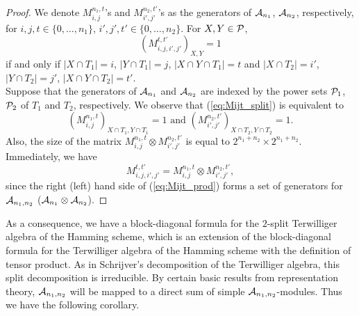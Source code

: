 \documentclass[final,onecolumn]{IEEEtran}
\theoremstyle{definition}
\begin{document}
\begin{proof}
	We denote $M_{i, j}^{n_{1}, t}$'s and $M_{i', j'}^{n_{2}, t'}$'s as the generators of ${\cal A}_{n_{1}}$, ${\cal A}_{n_{2}}$, respectively, for $i, j, t \in \{0, \dots, n_{1}\}$, $i', j', t' \in \{0, \dots, n_{2}\}$. For $X, Y \in {\cal P}$,
	\begin{equation}
		(M_{i, j, i', j'}^{t, t'})_{X, Y} = 1  \label{eq:Mijt_split}
	\end{equation}
	if and only if $\lvert X \cap T_{1}\rvert = i$, $\lvert Y \cap T_{1}\rvert = j$, $\lvert X \cap Y \cap T_{1}\rvert = t$ and $\lvert X \cap T_{2}\rvert = i'$, $\lvert Y \cap T_{2}\rvert = j'$, $\lvert X \cap Y \cap T_{2}\rvert = t'$.\\
	Suppose that the generators of ${\cal A}_{n_{1}}$ and ${\cal A}_{n_{2}}$ are indexed by the power sets ${\cal P}_{1}$, ${\cal P}_{2}$ of $T_{1}$ and $T_{2}$, respectively. We observe that  (\ref{eq:Mijt_split}) is equivalent to
	\begin{equation*}
		(M_{i, j}^{n_{1}, t})_{X\cap T_{1}, Y\cap T_{1}} = 1 \text{ and } (M_{i', j'}^{n_{2}, t'})_{X\cap T_{2}, Y\cap T_{2}} = 1.
	\end{equation*}
	Also, the size of the matrix $M_{i, j}^{n_{1}, t} \otimes M_{i', j'}^{n_{2}, t'}$ is equal to $2^{n_{1}+n_{2}} \times 2^{n_{1}+n_{2}}$. Immediately, we have
	\begin{equation}
		M_{i, j, i', j'}^{t, t'} = M_{i, j}^{n_{1}, t} \otimes M_{i', j'}^{n_{2}, t'}, \label{eq:Mijt_prod}
	\end{equation}
	since the right (left) hand side of (\ref{eq:Mijt_prod}) forms a set of generators for ${\cal A}_{n_{1}, n_{2}}$ (${\cal A}_{n_{1}} \otimes {\cal A}_{n_{2}}$).
	\end{proof}
As a consequence, we have a block-diagonal formula for  the $2$-split Terwilliger algebra of the Hamming scheme, which is an extension of the block-diagonal formula for the Terwilliger algebra of the Hamming scheme with the definition of tensor product. As in Schrijver's decomposition of the Terwilliger algebra, this split decomposition is irreducible. By certain basic results from representation theory,  ${\cal A}_{n_{1}, n_{2}}$ will be mapped to a direct sum of simple ${\cal A}_{n_{1}, n_{2}}$-modules. Thus we have the following corollary.
	
\end{document}
